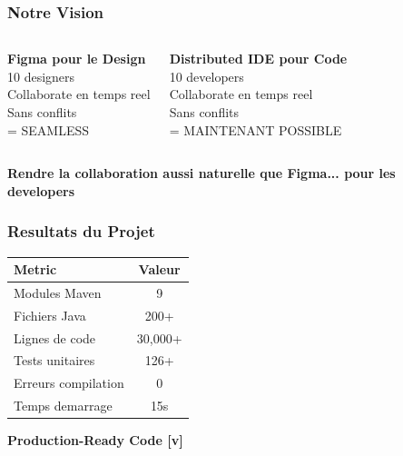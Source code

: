 \documentclass[aspectratio=16:9]{beamer}
\begin{document}
\begin{frame}
  \frametitle{Notre Vision}
  
  \begin{columns}
    \centering
    \textbf{Figma pour le Design}\\[0.5cm]
    \small
    10 designers\\
    Collaborate en temps reel\\
    Sans conflits\\
    = SEAMLESS
    
    \centering
    \textbf{Distributed IDE pour Code}\\[0.5cm]
    \small
    10 developers\\
    Collaborate en temps reel\\
    Sans conflits\\
    = MAINTENANT POSSIBLE
  \end{columns}
  
  \vspace{0.8cm}
  
  \centering
  \large\textbf{Rendre la collaboration aussi naturelle que Figma... pour les developers}
\end{frame}

\begin{frame}
  \frametitle{Resultats du Projet}
  
  \centering
  
  \begin{tabular}{l|c}
    \textbf{Metric} & \textbf{Valeur} \\
    \hline
    Modules Maven & 9 \\
    Fichiers Java & 200+ \\
    Lignes de code & 30,000+ \\
    Tests unitaires & 126+ \\
    Erreurs compilation & 0 \\
    Temps demarrage & 15s \\
    \hline
  \end{tabular}
  
  \bigskip
  
  \centering
  \textcolor{SuccessGreen}{\textbf{Production-Ready Code [v]}}
\end{frame}

\end{document}
